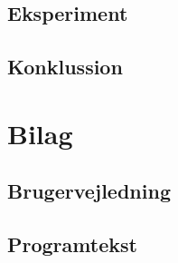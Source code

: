 \documentclass[a4paper]{report}
\begin{document}
\subsection*{Eksperiment}

\subsection*{Konklussion}

\newpage
\section*{Bilag}

\subsection*{Brugervejledning}

\subsection*{Programtekst}
\lstset{language=FSharp}

\end{document}

